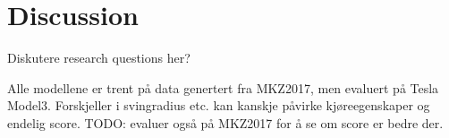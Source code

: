 \chapter{Discussion}
\label{chap:discussion}


Diskutere research questions her?

Alle modellene er trent på data genertert fra MKZ2017,
men evaluert på Tesla Model3.
Forskjeller i svingradius etc. kan kanskje påvirke kjøreegenskaper og endelig score.
TODO: evaluer også på MKZ2017 for å se om score er bedre der.
